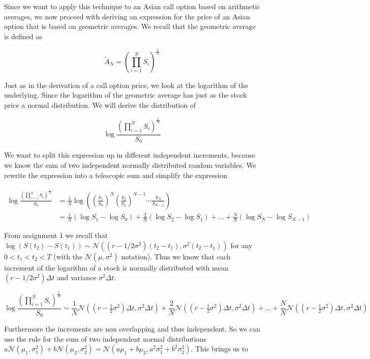 \documentclass[11pt,a4paper]{article}
\begin{document}
Since we want to apply this technique to an Asian call option based on arithmetic averages, we now proceed with deriving an expression for the price of an Asian option that is based on geometric averages. We recall that the geometric average is defined as

\begin{equation}
\label{eq:as}
\widetilde{A}_N=\left(\prod_{i=1}^N S_i\right)^{\frac{1}{N}}
\end{equation}

Just as in the derivation of a call option price, we look at the logarithm of the underlying. Since the logarithm of the geometric average has just as the stock price a normal distribution. We will derive the distribution of 

\begin{equation}
\log\frac{\left(\prod_{i=1}^N S_i\right)^{\frac{1}{N}}}{S_0}
\end{equation}

We want to split this expression up in different independent increments, because we know the sum of two independent normally distributed random variables. We rewrite the expression into a telescopic sum and simplify the expression

\begin{align}
\log\frac{\left(\prod_{i=1}^N S_i\right)^{\frac{1}{N}}}{S_0}&=\frac{1}{N}\log\left(\left(\frac{S_1}{S_0}\right)^N\left(\frac{S_2}{S_1}\right)^{N-1}\cdots\frac{S_N}{S_{N-1}}\right)\\
&=\frac{1}{N}(\log S_1-\log S_0)+\frac{2}{N}(\log S_2- \log S_1)+\ldots+\frac{N}{N}(\log S_N-\log S_{N-1})
\end{align}

From assignment 1 we recall that $\log(S(t_2)-S(t_1))\sim\mathcal{N}((r-1/2\sigma^2)(t_2-t_1),\sigma^2(t_2-t_1))$ for any $0<t_1<t_2<T$ (with the $\mathcal{N}(\mu,\sigma^2)$ notation). Thus we know that each increment of the logarithm of a stock is normally distributed with mean $(r-1/2\sigma^2)\Delta t$ and variance $\sigma^2 \Delta t$. 

\begin{equation}
\log\frac{\left(\prod_{i=1}^N S_i\right)^{\frac{1}{N}}}{S_0}\sim \frac{1}{N}\mathcal{N}((r-\tfrac{1}{2}\sigma^2)\Delta t,\sigma^2 \Delta t)+\frac{2}{N}\mathcal{N}((r-\tfrac{1}{2}\sigma^2)\Delta t,\sigma^2 \Delta t)+\ldots+\frac{N}{N}\mathcal{N}((r-\tfrac{1}{2}\sigma^2)\Delta t,\sigma^2 \Delta t)
\end{equation}

Furthermore the increments are non overlapping and thus independent. So we can use the rule for the sum of two independent normal distributions $a\mathcal{N}(\mu_1,\sigma_1^2)+b\mathcal{N}(\mu_2,\sigma_2^2)=\mathcal{N}(a\mu_1+b\mu_2,a^2\sigma_1^2+b^2\sigma_2^2)$. This brings us to
\end{document}

